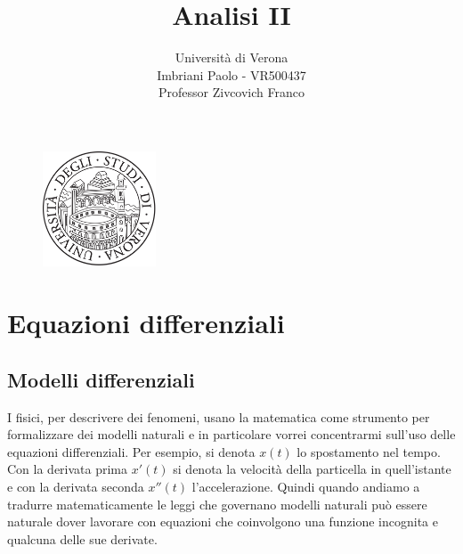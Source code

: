 \documentclass[a4paper]{article}
\title{Analisi II}
\author{Università di Verona\\Imbriani Paolo - VR500437\\Professor Zivcovich Franco}
\numberwithin{equation}{subsection}
\begin{document}
\begin{figure}
    \centering
    \includegraphics[width=0.3\textwidth]{../UniversityofVerona.png}
\end{figure}

\maketitle 

\pagebreak

\tableofcontents

\pagebreak

\section{Equazioni differenziali}

\subsection{Modelli differenziali}

I fisici, per descrivere dei fenomeni, usano la matematica come strumento per formalizzare dei modelli naturali e in particolare vorrei concentrarmi sull'uso delle equazioni differenziali. 
Per esempio, si denota $x(t)$ lo spostamento nel tempo.
Con la derivata prima $x'(t)$ si denota la velocità della particella in quell'istante e con la derivata seconda $x''(t)$ l'accelerazione.
Quindi quando andiamo a tradurre
matematicamente le leggi che governano modelli naturali può essere naturale dover lavorare
con equazioni che coinvolgono una funzione incognita e qualcuna delle sue derivate.
\end{document}
